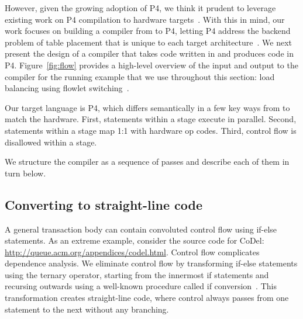 However, given the growing adoption of P4, we think it prudent to leverage
existing work on P4 compilation to hardware targets~\cite{netronome, xilinx}.
With this in mind, our work focuses on building a compiler from \pktlanguage to
P4, letting P4 address the backend problem of table placement that is unique to
each target architecture~\cite{lavanya_compiler}.
We next present the design of a compiler that takes code written in
\pktlanguage{} and produces code in P4. Figure~\ref{fig:flow} provides a
high-level overview of the input and output to the compiler for the running
example that we use throughout this section: load balancing using flowlet
switching~\cite{dina_flowlets}.

Our target language is P4, which differs semantically in a few key ways from
\pktlanguage{} to match the hardware. First, statements within a stage execute
in parallel. Second, statements within a stage map 1:1 with hardware op codes.
Third, control flow is disallowed within a stage.

We structure the compiler as a sequence of passes and describe each of them in
turn below. 


\subsection{Converting to straight-line code}
A general transaction body can contain convoluted control flow using if-else
statements. As an extreme example, consider the source code for CoDel:
\url{http://queue.acm.org/appendices/codel.html}. Control flow complicates
dependence analysis. We eliminate control flow by transforming if-else
statements using the ternary operator, starting from the innermost if
statements and recursing outwards using a well-known procedure called if
conversion~\cite{allen_if_conversion}.  This transformation creates
straight-line code, where control always passes from one statement to the next
without any branching.

